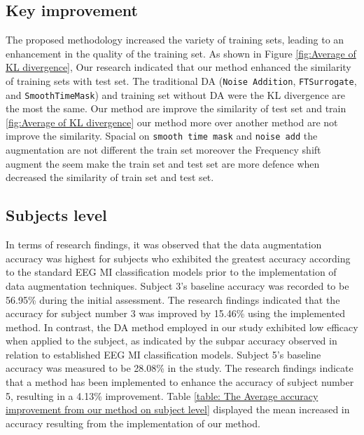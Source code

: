 \documentclass[runningheads]{llncs}
\begin{document}
\subsection{Key improvement}

The proposed methodology increased the variety of training sets, leading to an enhancement in the quality of the training set. As shown in Figure \ref{fig:Average of KL divergence}, Our research indicated that our method enhanced the similarity of training sets with test set. The traditional DA (\texttt{Noise Addition}, \texttt{FTSurrogate}, and \texttt{SmoothTimeMask}) and training set without DA were the KL divergence are the most the same. 
Our method are improve the similarity of test set and train \ref{fig:Average of KL divergence} our method more over another method are not improve the similarity. Spacial on \texttt{smooth time mask} and \texttt{noise add} the augmentation are not different the train set moreover the Frequency shift augment the seem make the train set and test set are more defence when decreased  the similarity of train set and test set.


\subsection{Subjects level}

In terms of research findings, it was observed that the data augmentation accuracy was highest for subjects who exhibited the greatest accuracy according to the standard EEG MI classification models prior to the implementation of data augmentation techniques. Subject 3's baseline accuracy was recorded to be 56.95\% during the initial assessment. The research findings indicated that the accuracy for subject number 3 was improved by 15.46\% using the implemented method. In contrast, the DA method employed in our study exhibited low efficacy when applied to the subject, as indicated by the subpar accuracy observed in relation to established EEG MI classification models. 
Subject 5's baseline accuracy was measured to be 28.08\% in the study. The research findings indicate that a method has been implemented to enhance the accuracy of subject number 5, resulting in a 4.13\% improvement. Table \ref{table: The Average accuracy improvement from our method on subject level} displayed the mean increased in accuracy resulting from the implementation of our method.
 
\end{document}
